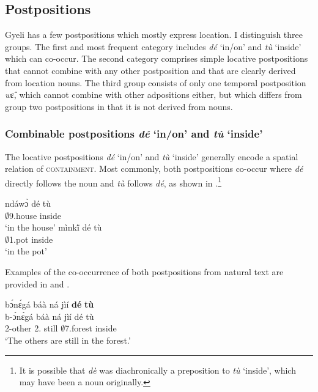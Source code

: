 






\subsection{Postpositions} 
\label{sec:POST}

Gyeli has a few postpositions which mostly express location. I distinguish three groups. The first and most frequent category includes {\itshape dé} `in/on' and {\itshape tù} `inside' which can co-occur. The second category comprises simple locative postpositions that cannot combine with any other postposition and that are clearly derived from location nouns. The third group consists of only one temporal postposition {\itshape wɛ̂}, which cannot combine with other adpositions either, but which differs from group two postpositions in that it is not derived from nouns.




\subsubsection[Combinable postpositions {\itshape dé} and {\itshape tù}]{Combinable postpositions {\itshape dé} `in/on' and {\itshape tù} `inside'}
\label{sec:LOCde}

The locative postpositions {\itshape dé} `in/on' and {\itshape tù} `inside' generally encode a spatial relation of \textsc{containment}. Most commonly, both postpositions co-occur where {\itshape dé} directly follows the noun and {\itshape tù} follows {\itshape dé}, as shown in .\footnote{It is possible that {\itshape dè} was diachronically a preposition to {\itshape tù} `inside', which may have been a noun originally.}

\ea \label{deN}
  \ea  \gll ndáwɔ̀ dé tù  \\
      $\emptyset$9.house {\LOC} inside \\
\trans`in the house'
\ex  \gll mìnkĩ́ dé tù  \\
 $\emptyset$1.pot {\LOC} inside \\
\trans `in the pot'
\z
\z

Examples of the co-occurrence of both postpositions from natural text are provided in  and .

\ea \label{detu1}
  \glll  bɔ́nɛ́gá báà ná jìí {\bfseries dé} {\bfseries tù} \\
        b-ɔ́nɛ́gá báà ná jìí dé tù \\
          2-other 2.{\COP} still $\emptyset$7.forest {\LOC} inside  \\
    \trans `The others are still in the forest.'
\z

